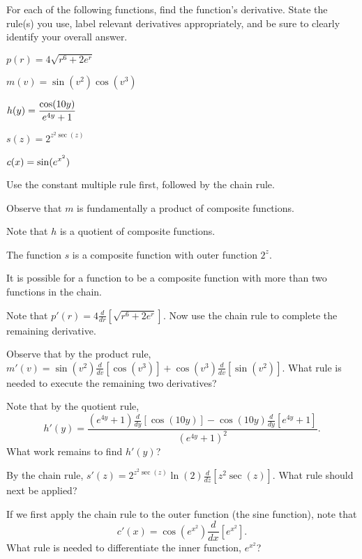 \begin{activity} \label{A:2.5.2}  
For each of the following functions, find the function's derivative.  State the rule(s) you use, label relevant derivatives appropriately, and be sure to clearly identify your overall answer.  
\ba
	\item $p(r) = 4\sqrt{r^6 + 2e^r}$
	\item $m(v) = \sin(v^2) \cos(v^3)$
	\item $\displaystyle h(y) = \frac{\cos(10y)}{e^{4y}+1}$
	\item $s(z) = 2^{z^2 \sec (z)}$
	\item $\displaystyle c(x) = \sin(e^{x^2})$
\ea
\end{activity}
\begin{smallhint}
\ba
	\item Use the constant multiple rule first, followed by the chain rule.
	\item Observe that $m$ is fundamentally a product of composite functions.
	\item Note that $h$ is a quotient of composite functions.
	\item The function $s$ is a composite function with outer function $2^z$.
	\item It is possible for a function to be a composite function with more than two functions in the chain.
\ea
\end{smallhint}
\begin{bighint}
\ba
	\item Note that $p'(r) = 4\frac{d}{dr}[\sqrt{r^6 + 2e^r}].$  Now use the chain rule to complete the remaining derivative.
	\item Observe that by the product rule, $m'(v) = \sin(v^2) \frac{d}{dv}[\cos(v^3)] + \cos(v^3) \frac{d}{dv}[\sin(v^2)].$  What rule is needed to execute the remaining two derivatives?
	\item Note that by the quotient rule,
	$$h'(y) = \frac{(e^{4y}+1) \frac{d}{dy}[\cos(10y)] - \cos(10y) \frac{d}{dy}[e^{4y}+1]}{(e^{4y}+1)^2}.$$
	What work remains to find $h'(y)$?
	\item By the chain rule, $s'(z) = 2^{z^2\sec(z)} \ln(2) \frac{d}{dz}[z^2 \sec(z)]$.  What rule should next be applied?
	\item If we first apply the chain rule to the outer function (the sine function), note that 
	$$c'(x) = \cos(e^{x^2}) \frac{d}{dx}[e^{x^2}].$$
	What rule is needed to differentiate the inner function, $e^{x^2}$?
\ea
\end{bighint}
